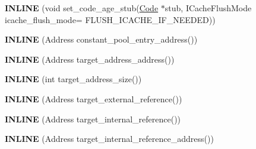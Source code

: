 \begin{DoxyCompactItemize}
\item 
{\bfseries I\+N\+L\+I\+NE} (void set\+\_\+code\+\_\+age\+\_\+stub(\hyperlink{classv8_1_1internal_1_1_code}{Code} $\ast$stub,                                                                                                                       I\+Cache\+Flush\+Mode icache\+\_\+flush\+\_\+mode=                                                                                                                                       F\+L\+U\+S\+H\+\_\+\+I\+C\+A\+C\+H\+E\+\_\+\+I\+F\+\_\+\+N\+E\+E\+D\+ED))\hypertarget{classv8_1_1internal_1_1_reloc_info_afd224eff71038ce7afa14f8042ea1b52}{}\label{classv8_1_1internal_1_1_reloc_info_afd224eff71038ce7afa14f8042ea1b52}

\item 
{\bfseries I\+N\+L\+I\+NE} (Address constant\+\_\+pool\+\_\+entry\+\_\+address())\hypertarget{classv8_1_1internal_1_1_reloc_info_a4079d9f09809a5edb5859f9ceb34f23e}{}\label{classv8_1_1internal_1_1_reloc_info_a4079d9f09809a5edb5859f9ceb34f23e}

\item 
{\bfseries I\+N\+L\+I\+NE} (Address target\+\_\+address\+\_\+address())\hypertarget{classv8_1_1internal_1_1_reloc_info_a2572ce3ce1269f8998e4742a3d7c647a}{}\label{classv8_1_1internal_1_1_reloc_info_a2572ce3ce1269f8998e4742a3d7c647a}

\item 
{\bfseries I\+N\+L\+I\+NE} (int target\+\_\+address\+\_\+size())\hypertarget{classv8_1_1internal_1_1_reloc_info_a8c54c1ada127ad24fd8723339b9b638b}{}\label{classv8_1_1internal_1_1_reloc_info_a8c54c1ada127ad24fd8723339b9b638b}

\item 
{\bfseries I\+N\+L\+I\+NE} (Address target\+\_\+external\+\_\+reference())\hypertarget{classv8_1_1internal_1_1_reloc_info_a3d73963c3ebc9ab57ccc050742701a5d}{}\label{classv8_1_1internal_1_1_reloc_info_a3d73963c3ebc9ab57ccc050742701a5d}

\item 
{\bfseries I\+N\+L\+I\+NE} (Address target\+\_\+internal\+\_\+reference())\hypertarget{classv8_1_1internal_1_1_reloc_info_a43b2544ad559bc18b23bc8ef0cd6fcca}{}\label{classv8_1_1internal_1_1_reloc_info_a43b2544ad559bc18b23bc8ef0cd6fcca}

\item 
{\bfseries I\+N\+L\+I\+NE} (Address target\+\_\+internal\+\_\+reference\+\_\+address())\hypertarget{classv8_1_1internal_1_1_reloc_info_ab7c15043cb2586a39e1ec6a55e2f5e5b}{}\label{classv8_1_1internal_1_1_reloc_info_ab7c15043cb2586a39e1ec6a55e2f5e5b}


\end{DoxyCompactItemize}
